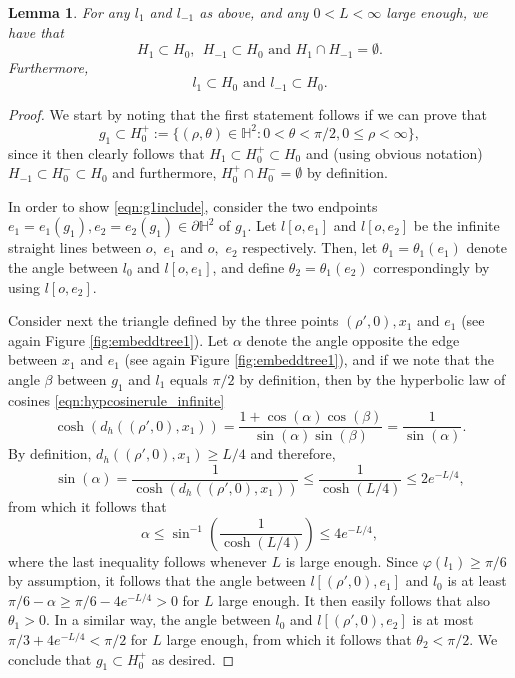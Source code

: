 \documentclass[10pt,a4paper]{amsart}
\newcommand{\BH}{{\mathbb{H}}}
\newtheorem{lemma}[theorem]{Lemma}
\begin{document}
\begin{lemma} \label{lemma:half-planes}
For any $l_1$ and $l_{-1}$ as above, and any $0<L<\infty$ large enough, we have that 
\[
H_1 \subset H_0, \ \  H_{-1} \subset H_0 \textrm{ and } H_1 \cap H_{-1} =\emptyset.
\]
Furthermore, 
\[
l_1 \subset H_0 \textrm{ and } l_{-1} \subset H_{0}.
\]
\end{lemma}
\begin{proof}
We start by noting that the first statement follows if we can prove that 
\begin{equation} \label{eqn:g1include}
   g_1 \subset H_0^+:=\{(\rho,\theta)\in \BH^2: 0< \theta < \pi/2, 0\leq \rho<\infty\}, 
\end{equation}
since it then clearly follows that 
$H_1 \subset H_0^+ \subset H_0$ and (using obvious notation) 
$H_{-1} \subset H_0^{-} \subset H_0$ and furthermore, 
$H_0^+ \cap H_0^-=\emptyset$ by definition.

In order to show \eqref{eqn:g1include}, consider the two endpoints 
$e_1=e_1(g_1),e_2=e_2(g_1) \in \partial \BH^2$ of $g_1$. 
Let $l[o,e_1]$ and $l[o,e_2]$  be the infinite straight lines between 
$o,$ $e_1$ and $o,$ $e_2$ respectively.
Then, let $\theta_1=\theta_1(e_1)$ denote the angle between $l_0$
and $l[o,e_1]$, and define $\theta_2=\theta_1(e_2)$ correspondingly by using 
$l[o,e_2]$.


Consider next the triangle defined by the three points 
$(\rho',0),x_1$ and $e_1$ 
(see again Figure \ref{fig:embeddtree1}). 
Let $\alpha$ denote the angle opposite the edge between $x_1$ and $e_1$
(see again Figure \ref{fig:embeddtree1}),
and if we note that the angle $\beta$ between 
$g_1$ and $l_1$ equals $\pi/2$ by definition, then by the hyperbolic law of cosines 
\eqref{eqn:hypcosinerule_infinite}
\[
\cosh(d_h((\rho',0),x_1))=\frac{1+\cos(\alpha)\cos(\beta)}{\sin(\alpha)\sin(\beta)}
=\frac{1}{\sin(\alpha)}.
\]
By definition, $d_h((\rho',0),x_1)\geq L/4$ and therefore,
\[
\sin(\alpha)=\frac{1}{\cosh(d_h((\rho',0),x_1))}\leq \frac{1}{\cosh(L/4)}
\leq 2e^{-L/4},
\]
from which it follows that 
\[
\alpha  \leq \sin^{-1}\left(\frac{1}{\cosh(L/4)}\right)\leq 4e^{-L/4},
\]
where the last inequality follows whenever $L$ is large enough. 
Since $\varphi(l_1) \geq \pi/6$ by assumption, it follows that the angle between 
$l[(\rho',0),e_1]$ and $l_0$ is at least $\pi/6-\alpha\geq \pi/6-4e^{-L/4}>0$ 
for $L$ large enough. It then easily follows that also $\theta_1>0.$
In a similar way, the angle between $l_0$ and $l[(\rho',0),e_2]$ is at most
$\pi/3+4e^{-L/4}<\pi/2$ for $L$ large enough, from which it follows that 
$\theta_2< \pi/2.$ We conclude that $g_1 \subset H_0^+$ as desired. 






\end{proof}
\end{document}
